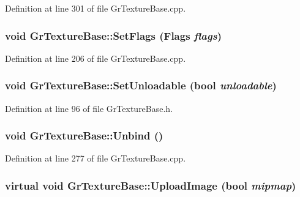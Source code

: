 \begin{CompactItemize}
Definition at line 301 of file GrTextureBase.cpp.\hypertarget{class_gr_texture_base_09675e3d061d4389c54ad7e0df5cb674}{
\subsubsection[{SetFlags}]{\setlength{\rightskip}{0pt plus 5cm}void GrTextureBase::SetFlags ({\bf Flags} {\em flags})}}
\label{class_gr_texture_base_09675e3d061d4389c54ad7e0df5cb674}




Definition at line 206 of file GrTextureBase.cpp.\hypertarget{class_gr_texture_base_db1eeb663d3d3301f675832b646be22e}{
\subsubsection[{SetUnloadable}]{\setlength{\rightskip}{0pt plus 5cm}void GrTextureBase::SetUnloadable (bool {\em unloadable})}}
\label{class_gr_texture_base_db1eeb663d3d3301f675832b646be22e}




Definition at line 96 of file GrTextureBase.h.\hypertarget{class_gr_texture_base_936b0525e5e40c7a4a591c5c345ee0ca}{
\subsubsection[{Unbind}]{\setlength{\rightskip}{0pt plus 5cm}void GrTextureBase::Unbind ()}}
\label{class_gr_texture_base_936b0525e5e40c7a4a591c5c345ee0ca}




Definition at line 277 of file GrTextureBase.cpp.\hypertarget{class_gr_texture_base_210a2e21f20c0c9da855315c72319cff}{
\subsubsection[{UploadImage}]{\setlength{\rightskip}{0pt plus 5cm}virtual void GrTextureBase::UploadImage (bool {\em mipmap})}}
\label{class_gr_texture_base_210a2e21f20c0c9da855315c72319cff}



\end{CompactItemize}
